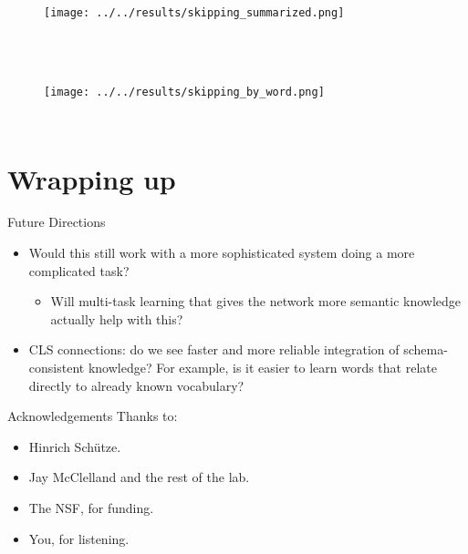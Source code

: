 \documentclass{beamer}
\begin{document}

\begin{frame}
  \begin{columns}
    \column{\dimexpr\paperwidth}
    \begin{figure}
    \texttt{[image: ../../results/skipping\_summarized.png]}
    \end{figure}
  \end{columns}
\begin{figure}
\end{figure}

\end{frame}
\begin{frame}
  \begin{columns}
    \column{\dimexpr\paperwidth}
    \begin{figure}
    \texttt{[image: ../../results/skipping\_by\_word.png]}
    \end{figure}
  \end{columns}
\begin{figure}
\end{figure}
\end{frame}
\section{Wrapping up}


\begin{frame}{Future Directions}
\begin{itemize}
    \item<1-> Would this still work with a more sophisticated system doing a more complicated task?
    \begin{itemize}
	\item<2-> Will multi-task learning that gives the network more semantic knowledge actually help with this? 
    \end{itemize}
    \item<3-> CLS connections: do we see faster and more reliable integration of schema-consistent knowledge? For example, is it easier to learn words that relate directly to already known vocabulary? 
\end{itemize}
\end{frame}

\begin{frame}{Acknowledgements}
Thanks to:
\begin{itemize}
    \item Hinrich Sch{\"u}tze.
    \item Jay McClelland and the rest of the lab.
    \item The NSF, for funding.
    \item You, for listening. 
\end{itemize}
\end{frame}
\end{document}
